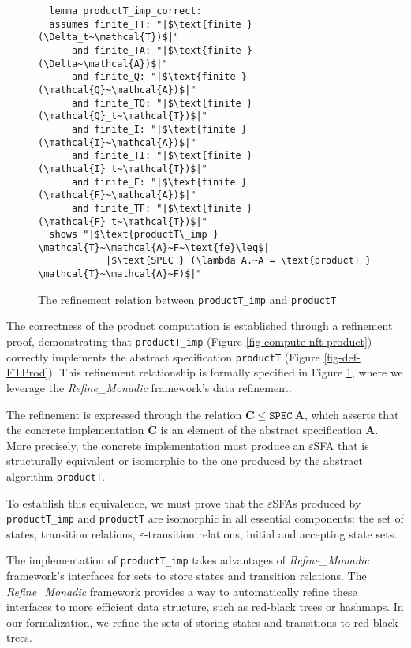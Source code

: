   \begin{figure}[hbt!]
    \begin{lstlisting}
  lemma productT_imp_correct:
  assumes finite_TT: "|$\text{finite } (\Delta_t~\mathcal{T})$|"
      and finite_TA: "|$\text{finite } (\Delta~\mathcal{A})$|"
      and finite_Q: "|$\text{finite } (\mathcal{Q}~\mathcal{A})$|"
      and finite_TQ: "|$\text{finite } (\mathcal{Q}_t~\mathcal{T})$|"
      and finite_I: "|$\text{finite } (\mathcal{I}~\mathcal{A})$|"
      and finite_TI: "|$\text{finite } (\mathcal{I}_t~\mathcal{T})$|"
      and finite_F: "|$\text{finite } (\mathcal{F}~\mathcal{A})$|"
      and finite_TF: "|$\text{finite } (\mathcal{F}_t~\mathcal{T})$|"
  shows "|$\text{productT\_imp } \mathcal{T}~\mathcal{A}~F~\text{fe}\leq$|
            |$\text{SPEC } (\lambda A.~A = \text{productT } \mathcal{T}~\mathcal{A}~F)$|"
  \end{lstlisting}
  \caption{The refinement relation between \texttt{productT\_imp} and \texttt{productT}}
  \label{fig-def-productT_imp_correct}
  \end{figure}

  The correctness of the product computation is established through a refinement proof, demonstrating that \texttt{productT\_imp} (Figure \ref{fig-compute-nft-product}) correctly implements the abstract specification \texttt{productT} (Figure \ref{fig-def-FTProd}). This refinement relationship is formally specified in Figure \ref{fig-def-productT_imp_correct}, where we leverage the \emph{Refine\_Monadic} framework's data refinement.

  The refinement is expressed through the relation $\mathbf{C} \leq \texttt{SPEC}~\mathbf{A}$, which asserts that the concrete implementation $\mathbf{C}$ is an element of the abstract specification $\mathbf{A}$. More precisely,  the concrete implementation must produce an $\varepsilon$SFA that is structurally equivalent or isomorphic to the one produced by the abstract algorithm \texttt{productT}.

  To establish this equivalence, we must prove that the $\varepsilon$SFAs produced by \texttt{productT\_imp} and \texttt{productT} are isomorphic in all essential components: the set of states, transition relations, $\varepsilon$-transition relations, initial and accepting state sets.



The implementation of \texttt{productT\_imp} takes advantages of \emph{Refine\_Monadic} framework's interfaces for sets to store states and transition relations. 
The \emph{Refine\_Monadic} framework provides a way to automatically refine these interfaces to more efficient data structure, such as red-black trees or hashmaps. 
In our formalization, we refine the sets of storing states and transitions to red-black trees.

